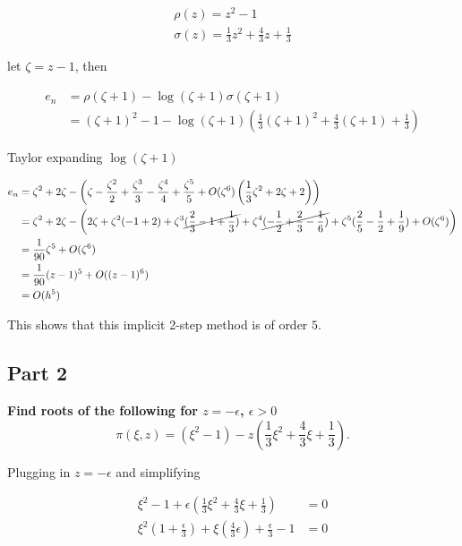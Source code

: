 \documentclass{article}
\begin{document}
 \begin{align*}
   \rho(z) = z^{2}-1 \\
   \sigma(z) = \frac{1}{3}z^{2} + \frac{4}{3}z + \frac{1}{3}
 \end{align*}

 let $ \zeta=z-1$, then
 
 \begin{align*}
   e_n &=\rho( \zeta + 1) - \log( \zeta + 1) \sigma( \zeta + 1) \\
        &= ( \zeta + 1)^{2} -1 -\log( \zeta + 1) \left( \frac{1}{3} ( \zeta
       +1)^{2} + \frac{4}{3}( \zeta + 1) + \frac{1}{3} \right)
 \end{align*}

 Taylor expanding $\log( \zeta+1)$

 \begin{align*}
   e_n &= \zeta^2 + 2 \zeta - \left( \zeta - \frac{\zeta^{2}}{2}
   + \frac{\zeta^{3}}{3} - \frac{\zeta^{4}}{4} + \frac{\zeta^{5}}{5} + O(
 \zeta^{6}) \left( \frac{1}{3} \zeta^{2} + 2 \zeta + 2\right)\right) \\
       &=\zeta^2 + 2 \zeta - \left(2 \zeta + \zeta^{2}(-1+2)
         + \zeta^{3}\cancel{(
         \frac{2}{3} -1 + \frac{1}{3})} + \zeta^{4}\cancel{(- \frac{1}{2} + \frac{2}{3}
       - \frac{1}{6})} + \zeta^{5} (\frac{2}{5}- \frac{1}{2} + \frac{1}{9}) + O(
   \zeta^{6})\right) \\
       &= \frac{1}{90} \zeta^{5} + O( \zeta^{6}) \\
       &= \frac{1}{90} (z-1)^{5} + O( (z-1)^{6}) \\
       &= O(h^{5})
 \end{align*}

 This shows that this implicit 2-step method is of order $5$.

 \subsection{Part 2}%
 \label{sub:part_2}

 \textbf{Find roots of the following for $z = - \epsilon$, $\epsilon > 0$} 
 \[
   \pi( \xi, z) = (\xi^{2} -1) - z\left(\frac{1}{3} \xi^{2}+ \frac{4}{3} \xi
   + \frac{1}{3}\right)
 .\] 

 Plugging in $z = -\epsilon$ and simplifying

  \begin{align*}
    \xi^{2} -1 + \epsilon \left( \frac{1}{3} \xi^{2} + \frac{4}{3} \xi
    + \frac{1}{3}\right) &= 0 \\
    \xi^{2} \left(1 + \frac{\epsilon}{3}\right) + \xi \left( \frac{4}{3}
  \epsilon\right) + \frac{\epsilon}{3} - 1 &= 0
 \end{align*}
 
\end{document}

